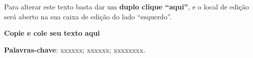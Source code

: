 \begin{resumo}

Para alterar este texto basta dar um 
\textbf{duplo clique “aqui”}, e o local de edição será aberto na sua caixa de edição do lado “esquerdo”.

\textbf{Copie e cole seu texto aqui}

    \noindent\textbf{Palavras-chave}: xxxxxx; xxxxxx; xxxxxxxx.
\end{resumo}